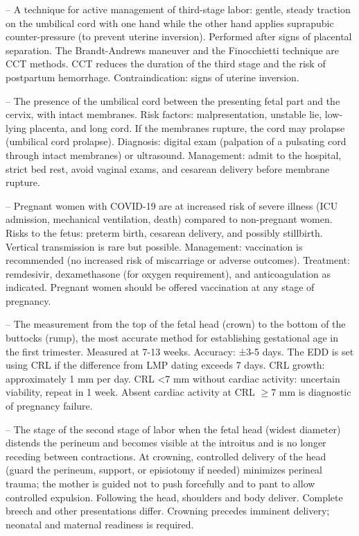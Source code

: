 -- A technique for active management of third-stage labor: gentle, steady traction on the umbilical cord with one hand while the other hand applies suprapubic counter-pressure (to prevent uterine inversion). Performed after signs of placental separation. The Brandt-Andrews maneuver and the Finocchietti technique are CCT methods. CCT reduces the duration of the third stage and the risk of postpartum hemorrhage. Contraindication: signs of uterine inversion.

-- The presence of the umbilical cord between the presenting fetal part and the cervix, with intact membranes. Risk factors: malpresentation, unstable lie, low-lying placenta, and long cord. If the membranes rupture, the cord may prolapse (umbilical cord prolapse). Diagnosis: digital exam (palpation of a pulsating cord through intact membranes) or ultrasound. Management: admit to the hospital, strict bed rest, avoid vaginal exams, and cesarean delivery before membrane rupture.

-- Pregnant women with COVID-19 are at increased risk of severe illness (ICU admission, mechanical ventilation, death) compared to non-pregnant women. Risks to the fetus: preterm birth, cesarean delivery, and possibly stillbirth. Vertical transmission is rare but possible. Management: vaccination is recommended (no increased risk of miscarriage or adverse outcomes). Treatment: remdesivir, dexamethasone (for oxygen requirement), and anticoagulation as indicated. Pregnant women should be offered vaccination at any stage of pregnancy.

-- The measurement from the top of the fetal head (crown) to the bottom of the buttocks (rump), the most accurate method for establishing gestational age in the first trimester. Measured at 7-13 weeks. Accuracy: ±3-5 days. The EDD is set using CRL if the difference from LMP dating exceeds 7 days. CRL growth: approximately 1 mm per day. CRL <7 mm without cardiac activity: uncertain viability, repeat in 1 week. Absent cardiac activity at CRL \(\ge\)7 mm is diagnostic of pregnancy failure.

-- The stage of the second stage of labor when the fetal head (widest diameter) distends the perineum and becomes visible at the introitus and is no longer receding between contractions. At crowning, controlled delivery of the head (guard the perineum, support, or episiotomy if needed) minimizes perineal trauma; the mother is guided not to push forcefully and to pant to allow controlled expulsion. Following the head, shoulders and body deliver. Complete breech and other presentations differ. Crowning precedes imminent delivery; neonatal and maternal readiness is required.

